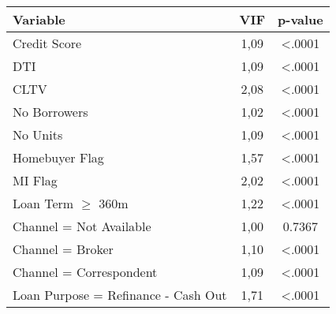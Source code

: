 \begin{table}[H]
\centering
\begin{tabular}{p{8cm}cc}\toprule   
\textbf{Variable}                                                                & \textbf{VIF} 					& \textbf{p-value} \\\midrule
Credit Score                                                                     & 1,09                             & \textless{}.0001                     \\
DTI                                                                              & 1,09                             & \textless{}.0001                     \\
CLTV                                                                             & 2,08                             & \textless{}.0001                     \\
No Borrowers                                                                     & 1,02                             & \textless{}.0001                     \\
No Units                                                                         & 1,09                             & \textless{}.0001                     \\
Homebuyer Flag                                                                   & 1,57                             & \textless{}.0001                     \\
MI Flag                                                                          & 2,02                             & \textless{}.0001                     \\
Loan Term $\geq$ 360m                                                            & 1,22                             & \textless{}.0001                     \\
Channel = Not Available                                                          & 1,00                             & 0.7367                               \\
Channel = Broker                                                                 & 1,10                             & \textless{}.0001                     \\
Channel = Correspondent                                                          & 1,09                             & \textless{}.0001                     \\
Loan Purpose = Refinance - Cash Out    											 & 1,71                             & \textless{}.0001                     \\

\end{tabular}
\end{table}
